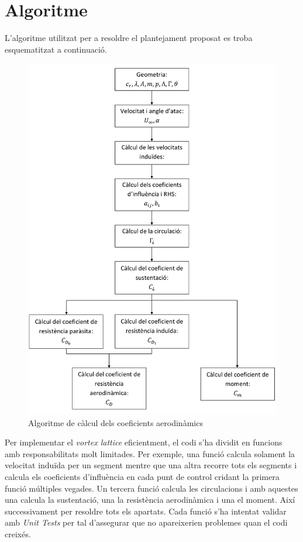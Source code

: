 \section{Algoritme}
\label{algoritmeala}
L'algoritme utilitzat per a resoldre el plantejament proposat es troba esquematitzat a continuació.

\begin{figure}[H]
	\centering
	\includegraphics[scale=0.170]{./plots/algoritmewing}
	\caption{Algoritme de càlcul dels coeficients aerodinàmics}
\end{figure}
Per implementar el \textit{vortex lattice} eficientment, el codi s'ha dividit en funcions  amb responsabilitats molt limitades. Per exemple, una funció calcula solament la velocitat induïda per un segment mentre que una altra recorre tots els segments i calcula els coeficients d'influència en cada punt de control cridant la primera funció múltiples vegades. Un tercera funció calcula les circulacions i amb aquestes una calcula la sustentació, una  la resistència aerodinàmica i una el moment. Així successivament per resoldre tots els apartats. Cada funció s'ha intentat validar amb \textit{Unit Tests} per tal d'assegurar que no apareixerien problemes quan el codi creixés.

